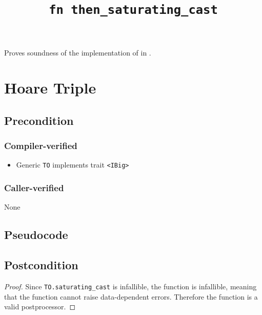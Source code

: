 \documentclass{article}
\title{\texttt{fn then\_saturating\_cast}}
\author{\MichaelShoemateAuthor}
\date{}
\begin{document}
\maketitle

\contrib
Proves soundness of the implementation of  in .

\section{Hoare Triple}
\subsection*{Precondition}
\subsubsection*{Compiler-verified}

\begin{itemize}
    \item Generic \texttt{TO} implements trait \texttt{<IBig>}
\end{itemize}

\subsubsection*{Caller-verified}
None

\subsection*{Pseudocode}


\subsection*{Postcondition}
\begin{theorem}
\end{theorem}

\begin{proof}
    Since \texttt{TO.saturating\_cast} is infallible, the function is infallible,
    meaning that the function cannot raise data-dependent errors.
    Therefore the function is a valid postprocessor.
\end{proof}
\end{document}
